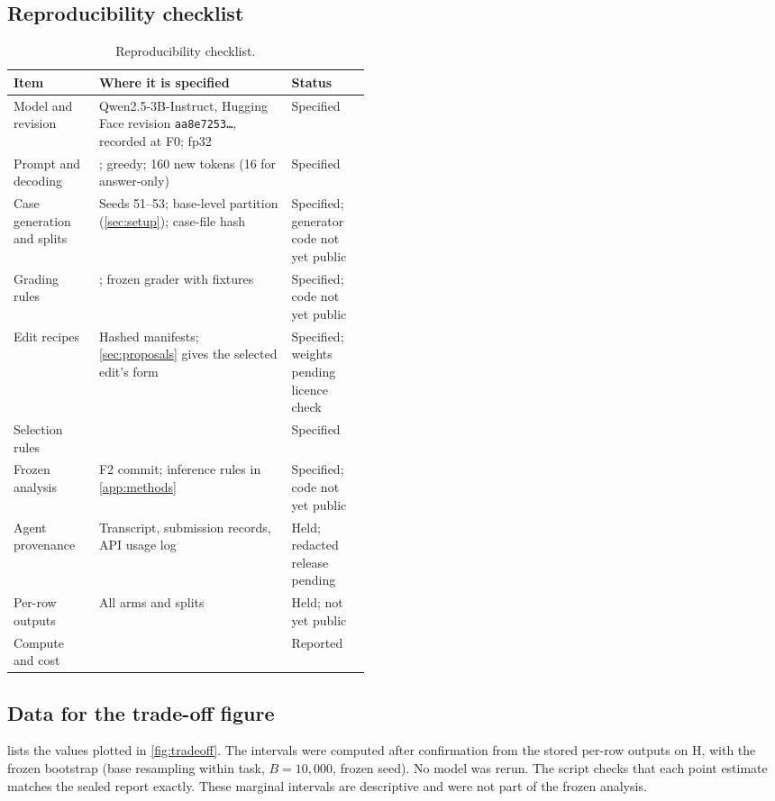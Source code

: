 \subsection{Reproducibility checklist}

\begin{table}[H]
\centering\small
\caption{Reproducibility checklist.}
\label{tab:checklist}
\begin{tabularx}{\linewidth}{@{}L{0.24\linewidth}YL{0.22\linewidth}@{}}
\toprule
Item & Where it is specified & Status \\
\midrule
Model and revision & Qwen2.5-3B-Instruct, Hugging Face revision \texttt{aa8e7253\ldots}, recorded at F0; fp32 & Specified \\
Prompt and decoding & ; greedy; 160 new tokens (16 for answer-only) & Specified \\
Case generation and splits & Seeds 51--53; base-level partition (\cref{sec:setup}); case-file hash & Specified; generator
code not yet public \\
Grading rules & ; frozen grader with fixtures & Specified; code not yet public \\
Edit recipes & Hashed manifests; \cref{sec:proposals} gives the selected edit's form & Specified; weights pending
licence check \\
Selection rules &  & Specified \\
Frozen analysis & F2 commit; inference rules in \cref{app:methods} & Specified; code not yet public \\
Agent provenance & Transcript, submission records, API usage log & Held; redacted release pending \\
Per-row outputs & All arms and splits & Held; not yet public \\
Compute and cost &  & Reported \\
\bottomrule
\end{tabularx}
\end{table}

\subsection{Data for the trade-off figure}
\label{app:figdata}

 lists the values plotted in \cref{fig:tradeoff}. The intervals were computed after confirmation
from the stored per-row outputs on H, with the frozen bootstrap (base resampling within task, $B = 10{,}000$, frozen
seed). No model was rerun. The script checks that each point estimate matches the sealed report exactly. These
marginal intervals are descriptive and were not part of the frozen analysis.

